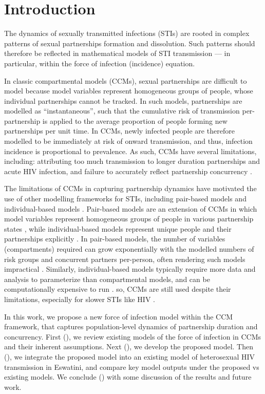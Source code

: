 \section{Introduction}\label{intro}
The dynamics of sexually transmitted infections (STIs) are rooted in
complex patterns of sexual partnerships formation and dissolution.
Such patterns should therefore be reflected in mathematical models of STI transmission
--- in particular, within the force of infection (incidence) equation.
\par
In classic compartmental models (CCMs), sexual partnerships are difficult to model
because model variables represent homogeneous groups of people,
whose individual partnerships cannot be tracked.
In such models, partnerships are modelled as ``instantaneous'',
such that the cumulative risk of transmission per-partnership is applied
to the average proportion of people forming new partnerships per unit time.
In CCMs, newly infected people are therefore modelled to be
immediately at risk of onward transmission,
and thus, infection incidence is proportional to prevalence.
As such, CCMs have several limitations, including:
attributing too much transmission to longer duration partnerships and acute HIV infection,
and failure to accurately reflect partnership concurrency \cite{Johnson2016a,Rao2021}.
\par
The limitations of CCMs in capturing partnership dynamics
have motivated the use of other modelling frameworks for STIs,
including pair-based models and individual-based models \cite{Rao2021}.
Pair-based models are an extension of CCMs in which
model variables represent homogeneous groups of people in various partnership states
\cite{Dietz1988,Ferguson2000,Kretzschmar2017}, while
individual-based models represent unique people and their partnerships explicitly
\cite{vanImhoff1998,Bershteyn2013}.
In pair-based models, the number of variables (compartments) required can grow exponentially with
the modelled numbers of risk groups and concurrent partners per-person,
often rendering such models impractical \cite{Rao2021}.
Similarly, individual-based models typically require more data and analysis to parameterize
than compartmental models, and can be computationally expensive to run \cite{Rao2021}.
so, CCMs are still used despite their limitations,
especially for slower STIs like HIV \cite{Rao2021}.
\par
In this work, we propose a new force of infection model within the CCM framework,
that captures population-level dynamics of partnership duration and concurrency.
First (), we review existing models of the force of infection in CCMs
and their inherent assumptions.
Next (), we develop the proposed model.
Then (), we integrate the proposed model
into an existing model of heterosexual HIV transmission in Eswatini,
and compare key model outputs under the proposed vs existing models.
We conclude () with some discussion of the results and future work.
